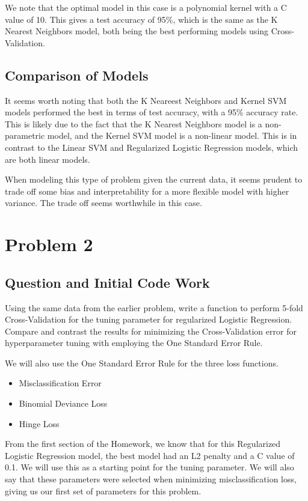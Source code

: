 \documentclass[12pt, letterpaper]{article}
\begin{document}
We note that the optimal model in this case is a polynomial kernel with a C value of 10. This gives a test accuracy of 95\%, which is the same as the K Nearest Neighbors model, both being the best performing models using Cross-Validation. 

\subsection{Comparison of Models} 

It seems worth noting that both the K Neareest Neighbors and Kernel SVM models performed the best in terms of test accuracy, with a 95\% accuracy rate. This is likely due to the fact that the K Nearest Neighbors model is a non-parametric model, and the Kernel SVM model is a non-linear model. This is in contrast to the Linear SVM and Regularized Logistic Regression models, which are both linear models. 

When modeling this type of problem given the current data, it seems prudent to trade off some bias and interpretability for a more flexible model with higher variance. The trade off seems worthwhile in this case. 

\section{Problem 2} 

\subsection{Question and Initial Code Work}

Using the same data from the earlier problem, write a function to perform 5-fold Cross-Validation for the tuning parameter for regularized Logistic Regression. 
Compare and contrast the results for minimizing the Cross-Validation error for hyperparameter tuning with employing the One Standard Error Rule. 

We will also use the One Standard Error Rule for the three loss functions. 

\begin{itemize}
  \item Misclassification Error 
  \item Binomial Deviance Loss 
  \item Hinge Loss 
\end{itemize} 

From the first section of the Homework, we know that for this Regularized Logistic Regression model, the best model had an L2 penalty and a C value of 0.1. We will use this as a starting point for the tuning parameter. We will also say that these parameters were selected when minimizing misclassification loss, giving us our first set of parameters for this problem. 
\end{document}
